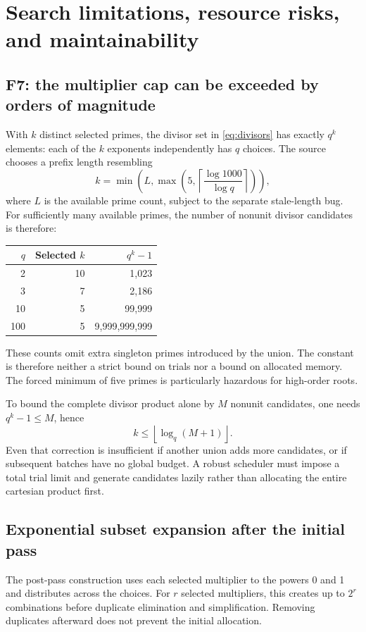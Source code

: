 \documentclass[11pt,letterpaper]{article}
\newcommand{\code}[1]{\texttt{\detokenize{#1}}}
\theoremstyle{definition}
\begin{document}
\section{Search limitations, resource risks, and maintainability}
\label{sec:resources}

\subsection{F7: the multiplier cap can be exceeded by orders of magnitude}
With $k$ distinct selected primes, the divisor set in \eqref{eq:divisors} has exactly
$q^k$ elements: each of the $k$ exponents independently has $q$ choices.
The source chooses a prefix length resembling
\[
 k=\min\!\left(L,\max\!\left(5,
       \left\lceil\frac{\log1000}{\log q}\right\rceil\right)\right),
\]
where $L$ is the available prime count, subject to the separate stale-length bug.
For sufficiently many available primes, the number of nonunit divisor candidates
is therefore:
\begin{center}
\begin{tabular}{@{}rrr@{}}
\toprule $q$ & Selected $k$ & $q^k-1$\\\midrule
2 & 10 & 1,023\\
3 & 7 & 2,186\\
10 & 5 & 99,999\\
100 & 5 & 9,999,999,999\\
\bottomrule
\end{tabular}
\end{center}
These counts omit extra singleton primes introduced by the union. The constant
\code{multipliercap = 1000} is therefore neither a strict bound on trials nor a
bound on allocated memory. The forced minimum of five primes is particularly
hazardous for high-order roots.

To bound the complete divisor product alone by $M$ nonunit candidates, one needs
$q^k-1\le M$, hence
\[
 k\le\left\lfloor\log_q(M+1)\right\rfloor.
\]
Even that correction is insufficient if another union adds more candidates, or if
subsequent batches have no global budget. A robust scheduler must impose a total
trial limit and generate candidates lazily rather than allocating the entire
cartesian product first.

\subsection{Exponential subset expansion after the initial pass}
The post-pass construction uses each selected multiplier to the powers 0 and 1
and distributes across the choices. For $r$ selected multipliers, this creates up
to $2^r$ combinations before duplicate elimination and simplification. Removing
duplicates afterward does not prevent the initial allocation.
\end{document}
